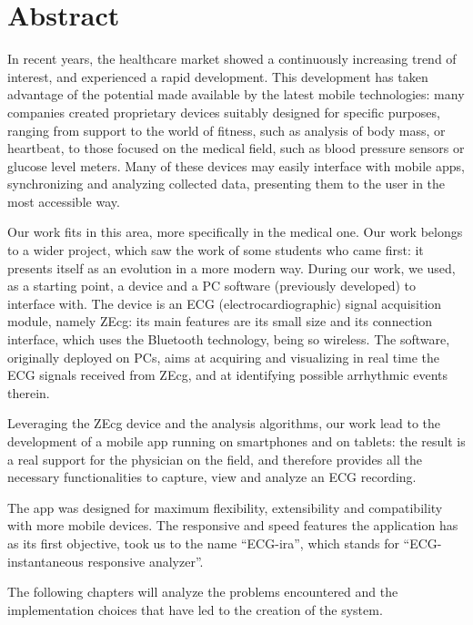 \chapter{Abstract}

In recent years, the healthcare market showed a continuously increasing trend of interest, and experienced a rapid development. This development has taken advantage of the potential made available by the latest mobile technologies: many companies created proprietary devices suitably designed for specific purposes, ranging from support to the world of fitness, such as analysis of body mass, or heartbeat, to those focused on the medical field, such as blood pressure sensors or glucose level meters. Many of these devices may easily interface with mobile apps, synchronizing and analyzing collected data, presenting them to the user in the most accessible way.

Our work fits in this area, more specifically in the medical one. Our work belongs to a wider project, which saw the work of some students who came first: it presents itself as an evolution in a more modern way. During our work, we used, as a starting point, a device and a PC software (previously developed) to interface with. The device is an ECG (electrocardiographic) signal acquisition module, namely ZEcg: its main features are its small size and its connection interface, which uses the Bluetooth technology, being so wireless.  The software, originally deployed on PCs, aims at acquiring and visualizing in real time the ECG signals received from ZEcg, and at identifying possible arrhythmic events therein.

Leveraging the ZEcg device and the analysis algorithms, our work lead to the development of a mobile app running on smartphones and on tablets: the result is a real support for the physician on the field, and therefore provides all the necessary functionalities to capture, view and analyze an ECG recording.

The app was designed for maximum flexibility, extensibility and compatibility with more mobile devices. The responsive and speed features the application has as its first objective, took us to the name ``ECG-ira'', which stands for ``ECG-instantaneous responsive analyzer''.

The following chapters will analyze the problems encountered and the implementation choices that have led to the creation of the system.
